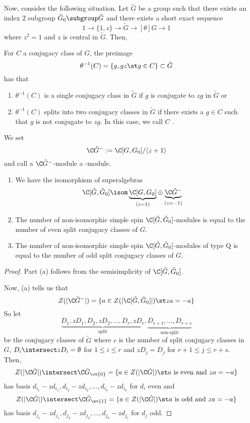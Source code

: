 \documentclass[11pt,leqno,oneside]{amsbook}
\numberwithin{thm}{section}
\begin{document}
Now, consider the following situation. Let \(\tilde{G}\) be a group
such that there exists an index \(2\) subgroup \(\tilde{G}_0 \subgroup
\tilde{G}\) and there exists a short exact sequence \[
  1 \to \{1,z\} \to \tilde{G} \to[\theta] G \to 1
\]
where \(z^2 = 1\) and \(z\) is central in \(\tilde{G}\). Then,
\begin{prop}
  For \(C\) a conjugacy class of \(G\), the preimage \[
    \theta^{-1}(C) = \{g, gz \st g \in C\} \subset \tilde{G}
  \]
  has that 
  \begin{enumerate}
  \item \(\theta^{-1}(C)\) is a single conjugacy class in \(\tilde{G}\) if \(g\) is
    conjugate to \(zg\) in \(\tilde{G}\) or
  \item \(\theta^{-1}(C)\) splits into two conjugacy classes in
    \(\tilde{G}\) if there exists a \(g \in C\) such that \(g\) is not
    conjugate to \(zg\). In this case, we call \(C\) .
  \end{enumerate}
\end{prop}
\begin{defn}
  We set \[
    \C\tilde{G}^- := \C[G,G_0]/\langle z+1 \rangle
  \]
  and call a \(\C\tilde{G}^-\)-module a -module. 
\end{defn}
\begin{prop}
  \begin{enumerate}
  \item   We have the isomorphism of superalgebras 
  \[\C[\tilde{G},\tilde{G}_0] \isom \underbrace{\C[G,G_0]}_{(z=1)}
    \oplus \underbrace{\C\tilde{G}^-}_{(z=-1)} \]
  \item The number of non-isomorphic simple spin
    \(\C[\tilde{G},\tilde{G}_0]\)-modules is equal to the number of
    even split conjugacy classes of \(G\).
  \item The number of non-isomorphic simple spin
    \(\C[\tilde{G},\tilde{G}_0]\)-modules of type Q is equal to the
    number of odd split conjugacy classes of \(G\).
  \end{enumerate}
\end{prop}
\begin{proof}
  Part (a) follows from the semisimplicity of
  \(\C[\tilde{G},\tilde{G}_0]\).

  Now, (a) tells us that \[
    Z(|\C\tilde{G}^-|) = \{a \in Z(|\C[\tilde{G},\tilde{G}_0]|) \st za
    = -a\}
  \]
  So let \[
    \underbrace{D_1, zD_1, D_2, zD_2, \ldots, D_r, zD_r}_{\text{split}}, \underbrace{D_{r+1}, \ldots,
  D_{r+s}}_{\text{non-split}}
  \] be the conjugacy classes of \(\tilde{G}\) where \(r\) is the
  number of split conjugacy classes in \(G\),  \(D_i \intersect zD_i =
  \emptyset\) for \(1 \leq i \leq r\) and \(zD_j = D_j\) for \(r+1
  \leq j \leq r+s\). Then, \[
    Z(|\C\tilde{G}|) \intersect \C\tilde{G}_{\ov{0}} = \{a \in Z(|\C
    \tilde{G}|) \st a \text{ is even and }za = -a\}
  \]
  has basis \(d_{i_1}-zd_{i_1}, d_{i_2}-zd_{i_2}, \ldots,
  d_{i_k}-zd_{i_k}\) for \(d_i\) even
  and  \[
    Z(|\C\tilde{G}|) \intersect \C\tilde{G}_{\ov{1}} = \{a \in Z(|\C
    \tilde{G}|) \st a \text{ is odd and }za = -a\}
  \]
  has basis \(d_{j_1}-zd_{j_1}, d_{j_2}-zd_{j_2}, \ldots,
  d_{j_k}-zd_{j_\ell}\) for \(d_j\) odd.
\end{proof}
\end{document}
